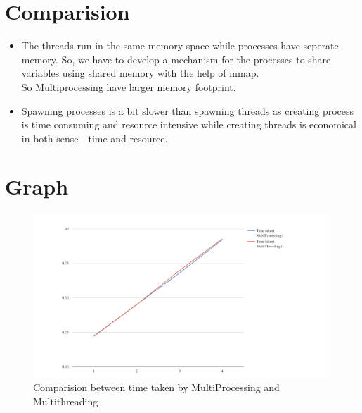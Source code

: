 \documentclass[12pt]{article}
\begin{document}
\section{Comparision}

\begin{itemize}
\item The threads run in the same memory space while processes have seperate memory.
So, we have to develop a mechanism for the processes to share variables using shared memory with the help of mmap.\\
So Multiprocessing have larger memory footprint.\\

\item Spawning processes is a bit slower than spawning threads as creating process is time consuming and resource intensive while creating threads is economical in both sense - time and resource.

\end{itemize}

\section{Graph}
\begin{figure}[ht!]
\includegraphics[width=200mm]{graph.png}
\caption{Comparision between time taken by MultiProcessing and Multithreading \label{overflow}}
\end{figure}
\end{document}
